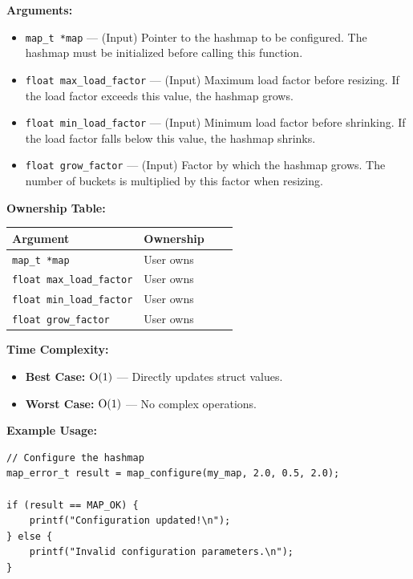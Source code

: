 \documentclass[titlepage]{article}
\begin{document}
\textbf{Arguments:}
\begin{itemize}
    \item \texttt{map\_t *map} --- (Input) Pointer to the hashmap to be configured.
    The hashmap must be initialized before calling this function.

    \item \texttt{float max\_load\_factor} --- (Input) Maximum load factor before resizing.
    If the load factor exceeds this value, the hashmap grows.

    \item \texttt{float min\_load\_factor} --- (Input) Minimum load factor before shrinking.
    If the load factor falls below this value, the hashmap shrinks.

    \item \texttt{float grow\_factor} --- (Input) Factor by which the hashmap grows.
    The number of buckets is multiplied by this factor when resizing.
\end{itemize}

\textbf{Ownership Table:}
\begin{center}
\begin{tabular}{@{} l l c c @{} }
\toprule
\textbf{Argument} & \textbf{Ownership}  \\
\midrule
\texttt{map\_t *map} & User owns  \\
\texttt{float max\_load\_factor} & User owns  \\
\texttt{float min\_load\_factor} & User owns  \\
\texttt{float grow\_factor} & User owns  \\
\bottomrule
\end{tabular}
\end{center}

\textbf{Time Complexity:}
\begin{itemize}
    \item \textbf{Best Case:} \( $O(1)$ \) --- Directly updates struct values.
    \item \textbf{Worst Case:} \( $O(1)$ \) --- No complex operations.
\end{itemize}

\textbf{Example Usage:}
\begin{verbatim}
// Configure the hashmap
map_error_t result = map_configure(my_map, 2.0, 0.5, 2.0);

if (result == MAP_OK) {
    printf("Configuration updated!\n");
} else {
    printf("Invalid configuration parameters.\n");
}
\end{verbatim}
\end{document}

